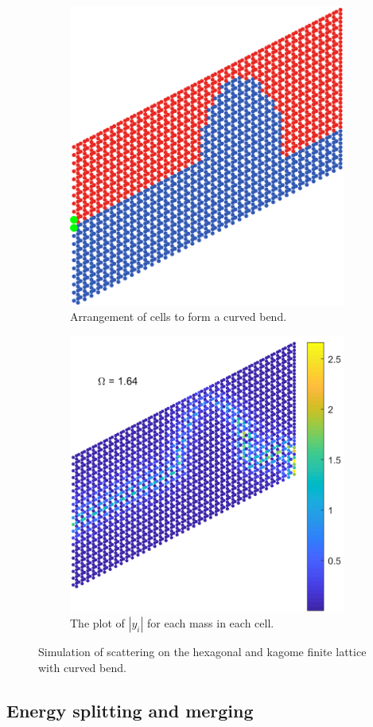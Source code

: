 \begin{figure}
\medskip
\centering
\begin{subfigure}[b]{.5\textwidth}
  \centering
  \includegraphics[width=0.8\linewidth]{imgs/kagomecurvedbendarr.png}
  \caption{Arrangement of cells to form a curved bend.}
  \label{fig:sub1}
\end{subfigure}%
\begin{subfigure}[b]{.5\textwidth}
  \centering
  \includegraphics[width=1\linewidth]{imgs/kagomecurvedbendscat.png}
  \caption{The plot of $|y_i|$ for each mass in each cell.}
  \label{fig:sub2}
\end{subfigure}
\caption{Simulation of scattering on the hexagonal and kagome finite lattice
  with curved bend.}
\label{fig:curvedbend}
\end{figure}

\subsection{Energy splitting and merging}

